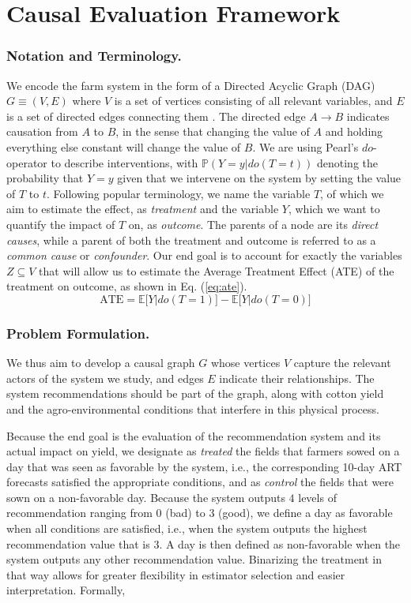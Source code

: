 \documentclass[letterpaper]{article} %
\begin{document}
\section{Causal Evaluation Framework}

\subsubsection{Notation and Terminology.}

We encode the farm system in the form of a Directed Acyclic Graph (DAG) $G \equiv (V,E)$ where $V$ is a set of vertices consisting of all relevant variables, and $E$ is a set of directed edges connecting them \cite{pearl2009causality}. The directed edge $A \rightarrow B$ indicates causation from $A$ to $B$, in the sense that changing the value of $A$ and holding everything else constant will change the value of $B$. We are using Pearl's $do$-operator to describe interventions, with $\mathbb{P}(Y=y|do(T=t))$ denoting the probability that $Y = y$ given that we intervene on the system by setting the value of $T$ to $t$. Following popular terminology, we name the variable $T$, of which we aim to estimate the effect, as \textit{treatment} and the variable $Y$, which we want to quantify the impact of $T$ on, as \textit{outcome}. The parents of a node are its \textit{direct causes}, while a parent of both the treatment and outcome is referred to as a \textit{common cause} or \textit{confounder}. Our end goal is to account for exactly the variables $Z \subseteq V$ that will allow us to estimate the Average Treatment Effect (ATE) of the treatment on outcome, as shown in Eq. (\ref{eq:ate}).
\begin{equation}\label{eq:ate}
\text{ATE} = \mathbb{E}\big[Y|do(T=1)\big] - \mathbb{E}\big[Y|do(T=0)\big]
\end{equation}

\subsubsection{Problem Formulation.}

We thus aim to develop a causal graph $G$ whose vertices $V$ capture the relevant actors of the system we study, and edges $E$ indicate their relationships.
The system recommendations should be part of the graph, along with cotton yield and the agro-environmental conditions that interfere in this physical process.

Because the end goal is the evaluation of the recommendation system and its actual impact on yield, we designate as \textit{treated} the fields that farmers sowed on a day that was seen as favorable by the system, i.e., the corresponding 10-day ART forecasts satisfied the appropriate conditions, and as \textit{control} the fields that were sown on a non-favorable day. Because the system outputs $4$ levels of recommendation ranging from $0$ (bad) to $3$ (good), we define a day as favorable when all conditions are satisfied, i.e., when the system outputs the highest recommendation value that is $3$. A day is then defined as non-favorable when the system outputs any other recommendation value. Binarizing the treatment in that way allows for greater flexibility in estimator selection and easier interpretation. Formally,
\end{document}

